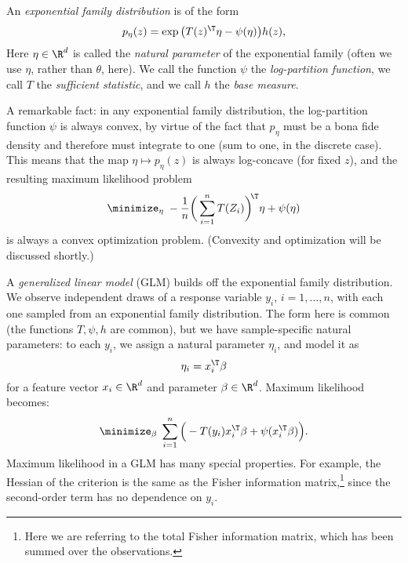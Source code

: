 \documentclass{article}
\begin{document}
An \emph{exponential family distribution} is of the form
\[
p_\eta(z) = \exp\big(T(z)^\T \eta - \psi(\eta)\big) h(z),
\]
Here $\eta \in \R^d$ is called the \emph{natural parameter} of the exponential  
family (often we use $\eta$, rather than $\theta$, here). We call the function
$\psi$ the \emph{log-partition function}, we call $T$ the \emph{sufficient
  statistic}, and we call $h$ the \emph{base measure}. 

A remarkable fact: in any exponential family distribution, the log-partition
function $\psi$ is always convex, by virtue of the fact that $p_\eta$ must be a
bona fide density and therefore must integrate to one (sum to one, in the
discrete case). This means that the map $\eta \mapsto p_\eta(z)$ is always
log-concave (for fixed $z$), and the resulting maximum likelihood problem       
\[
\minimize_\eta \; -\frac{1}{n} \bigg( \sum_{i=1}^n T(Z_i) \bigg)^{\hspace{-2pt}
  \T} \eta + \psi(\eta)    
\]
is always a convex optimization problem. (Convexity and optimization will be
discussed shortly.) 

A \emph{generalized linear model} (GLM) builds off the exponential family
distribution. We observe independent draws of a response variable $y_i$,
$i=1,\dots,n$, with each one sampled from an exponential family
distribution. The form here is common (the functions $T, \psi, h$ are common),
but we have sample-specific natural parameters: to each $y_i$, we assign a
natural parameter $\eta_i$, and model it as  
\[
\eta_i = x_i^\T \beta
\] 
for a feature vector $x_i \in \R^d$ and parameter $\beta \in \R^d$. Maximum
likelihood becomes:   
\[
\minimize_\beta \; \sum_{i=1}^n \Big( -T(y_i) x_i^\T \beta + \psi(x_i^\T \beta)
\Big).  
\]
Maximum likelihood in a GLM has many special properties. For example, the
Hessian of the criterion is the same as the Fisher information
matrix,\footnote{Here we are referring to the total Fisher information matrix,
  which has been summed over the observations.} 
since the second-order term has no dependence on $y_i$. 
\end{document}
